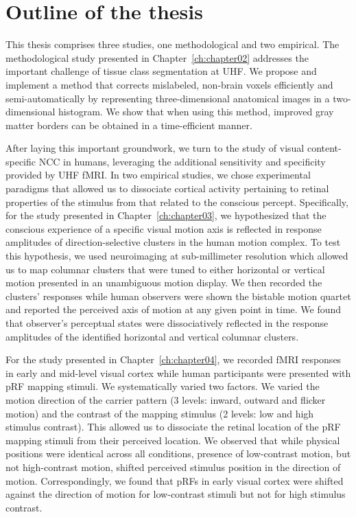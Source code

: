 \section{Outline of the thesis}
This thesis comprises three studies, one methodological and two empirical. The methodological study presented in Chapter~\ref{ch:chapter02} addresses the important challenge of tissue class segmentation at UHF. We propose and implement a method that corrects mislabeled, non-brain voxels efficiently and semi-automatically by representing three-dimensional anatomical images in a two-dimensional histogram. We show that when using this method, improved gray matter borders can be obtained in a time-efficient manner.

After laying this important groundwork, we turn to the study of visual content-specific NCC in humans, leveraging the additional sensitivity and specificity provided by UHF fMRI. In two empirical studies, we chose experimental paradigms that allowed us to dissociate cortical activity pertaining to retinal properties of the stimulus from that related to the conscious percept. Specifically, for the study presented in Chapter~\ref{ch:chapter03}, we hypothesized that the conscious experience of a specific visual motion axis is reflected in response amplitudes of direction-selective clusters in the human motion complex. To test this hypothesis, we used neuroimaging at sub-millimeter resolution which allowed us to map columnar clusters that were tuned to either horizontal or vertical motion presented in an unambiguous motion display. We then recorded the clusters' responses while human observers were shown the bistable motion quartet and reported the perceived axis of motion at any given point in time. We found that observer's perceptual states were dissociatively reflected in the response amplitudes of the identified horizontal and vertical columnar clusters.

For the study presented in Chapter~\ref{ch:chapter04}, we recorded fMRI responses in early and mid-level visual cortex while human participants were presented with pRF mapping stimuli. We systematically varied two factors. We varied the motion direction of the carrier pattern (3 levels: inward, outward and flicker motion) and the contrast of the mapping stimulus (2 levels: low and high stimulus contrast). This allowed us to dissociate the retinal location of the pRF mapping stimuli from their perceived location. We observed that while physical positions were identical across all conditions, presence of low-contrast motion, but not high-contrast motion, shifted perceived stimulus position in the direction of motion. Correspondingly, we found that pRFs in early visual cortex were shifted against the direction of motion for low-contrast stimuli but not for high stimulus contrast.

\clearpage
\printbibliography[heading=subbibnumbered, title={References}]